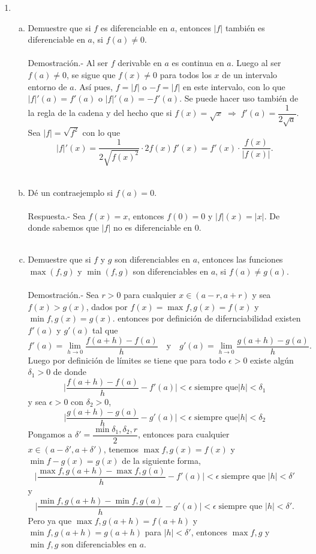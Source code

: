 \begin{enumerate}[\bfseries 1.]
     \item
	 \begin{enumerate}[(a)]

	     \item Demuestre que si $f$ es diferenciable en $a$, entonces $|f|$ también es diferenciable en $a$, si $f(a)\neq 0.$\\\\
		 Demostración.-\; Al ser $f$ derivable en $a$ es continua en $a$. Luego al ser $f(a)\neq 0$, se sigue que $f(x)\neq 0$ para todos los $x$ de un intervalo entorno de $a$. Así pues, $f=|f|$ o $-f=|f|$ en este intervalo, con lo que $|f|'(a)=f'(a)$ o $|f|'(a)=-f'(a)$. Se puede hacer uso también de la regla de la cadena y del hecho que si $f(x)=\sqrt{x}\; \Rightarrow \; f'(a)=\dfrac{1}{2\sqrt{a}}$. Sea $|f|=\sqrt{f^2}$ con lo que 
		 $$|f|'(x)=\dfrac{1}{2\sqrt{f(x)^2}} \cdot 2f(x)f'(x)=f'(x)\cdot \dfrac{f(x)}{|f(x)|}.$$\\

	     \item Dé un contraejemplo si $f(a)=0$.\\\\
		 Respuesta.-\; Sea $f(x)=x$, entonces $f(0)=0$ y $|f|(x)=|x|.$ De donde sabemos que $|f|$ no es diferenciable en $0$.\\\\ 

	     \item Demuestre que si $f$ y $g$ son diferenciables en $a$, entonces las funciones $\max(f,g)$ y $\min(f,g)$ son diferenciables en $a$, si $f(a)\neq g(a)$.\\\\
		 Demostración.-\; Sea $r>0$ para cualquier $x\in (a-r,a+r)$ y sea $f(x)>g(x)$, dados por $f(x)=\max{f,g}(x)=f(x)$ y $\min{f,g}(x)=g(x).$ entonces por definición de difernciabilidad existen $f'(a)$ y $g'(a)$ tal que
		 $$f'(a)=\lim_{h\to 0}\dfrac{f(a+h)-f(a)}{h}\quad \mbox{y}\quad g'(a)=\lim_{h\to 0}\dfrac{g(a+h)-g(a)}{h}.$$
		 Luego por definición de límites se tiene que para todo $\epsilon>0$ existe algún $\delta_1>0$ de donde
		 $$\bigg|\dfrac{f(a+h)-f(a)}{h}-f'(a)\bigg|<\epsilon\; \mbox{siempre que}|h|<\delta_1$$
		 y sea $\epsilon>0$ con $\delta_2>0$,
		 $$\bigg|\dfrac{g(a+h)-g(a)}{h}-g'(a)\bigg|<\epsilon\; \mbox{siempre que}|h|<\delta_2$$
		 Pongamos a $\delta'=\dfrac{\min{\delta_1,\delta_2,r}}{2}$, entonces para cualquier $x\in\left(a-\delta',a+\delta'\right)$, tenemos $\max{f,g}(x)=f(x)$ y $\min{f-g}(x)=g(x)$ de la siguiente forma,
		 $$\bigg|\dfrac{\max{f,g}(a+h)-\max{f,g}(a)}{h}-f'(a)\bigg|<\epsilon\; \mbox{siempre que }|h|<\delta'$$
		 y
		 $$\bigg|\dfrac{\min{f,g}(a+h)-\min{f,g}(a)}{h}-g'(a)\bigg|<\epsilon\; \mbox{siempre que }|h|<\delta'.$$
		 Pero ya que $\max{f,g}(a+h)=f(a+h)$ y $\min{f,g}(a+h)=g(a+h)$ para $|h|<\delta'$, entonces $\max{f,g}$ y $\min{f,g}$ son diferenciables en $a$.\\\\  


\end{enumerate}
\end{enumerate}
